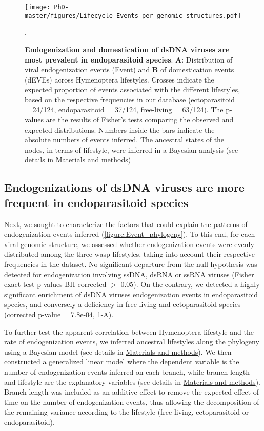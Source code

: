 \begin{figure}[!htbp]
 \centering
  \texttt{[image: PhD-master/figures/Lifecycle\_Events\_per\_genomic\_structures.pdf]}
\caption[Paper1:Distribution of Events and dEvents among viral genomic structures and between lifestyles]{\textbf{Endogenization and domestication of dsDNA viruses are most prevalent in endoparasitoid species}. \textbf{A}: Distribution of viral endogenization events (Event) and  \textbf{B} of domestication events (dEVEs) across Hymenoptera lifestyles.
Crosses indicate the expected proportion of events associated with the different lifestyles, based on the respective frequencies in our database (ectoparasitoid = 24/124, endoparasitoid = 37/124, free-living = 63/124). The p-values are the results of Fisher's tests comparing the observed and expected distributions. Numbers inside the bars indicate the absolute numbers of events inferred. The ancestral states of the nodes, in terms of lifestyle, were inferred in a Bayesian analysis  (see details in \hyperref[sec:MM-5]{Materials and methods})} \label{figure:Lifecycle_Events_per_genomic_structures}.
\end{figure}

\subsection{Endogenizations of dsDNA viruses are more frequent in endoparasitoid species }

Next, we sought to characterize the factors that could explain the patterns of endogenization events inferred (\figurename{\ref{figure:Event_phylogeny}}). To this end, for each viral genomic structure, we assessed whether  endogenization events were evenly distributed among the three wasp lifestyles, taking into account their respective frequencies in the dataset. No significant departure from the null hypothesis was detected for endogenization involving ssDNA, dsRNA or ssRNA viruses (Fisher exact test p-values BH corrected $>$ 0.05). On the contrary, we detected a highly significant enrichment of dsDNA viruses endogenization events in endoparasitoid species, and conversely a deficiency in free-living and ectoparasitoid species (corrected p-value = 7.8e-04, \figurename{ \ref{figure:Lifecycle_Events_per_genomic_structures}-A}). 

To further test the apparent correlation between Hymenoptera lifestyle and the rate of endogenization events, we inferred ancestral lifestyles along the phylogeny using a Bayesian model (see details in  \hyperref[sec:MM-12]{Materials and methods}). We then constructed a generalized linear model where the dependent variable is the number of endogenization events inferred on each branch, while branch length and lifestyle are the explanatory variables (see details in \hyperref[sec:MM-5]{Materials and methods}). Branch length was included as an additive effect to remove the expected effect of time on the number of endogenization events, thus allowing the decomposition of the remaining variance according to the lifestyle (free-living, ectoparasitoid or endoparasitoid).

